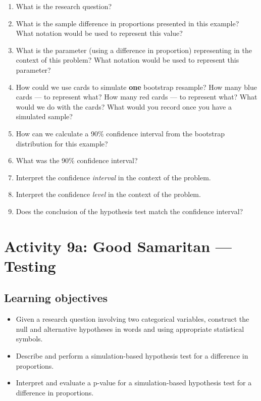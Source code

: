 \documentclass[
]{report}
\newcommand{\rgs}{\vspace{12pt}} %
\begin{document}
\begin{enumerate}
\def\labelenumi{\arabic{enumi}.}
\item
  What is the research question?
  \rgs
\item
  What is the sample difference in proportions presented in this example? What notation would be used to represent this value?
  \rgs
\item
  What is the parameter (using a difference in proportion) representing in the context of this problem? What notation would be used to represent this parameter?
  \rgs
  \rgs
\item
  How could we use cards to simulate \textbf{one} bootstrap resample? How many blue cards --- to represent what? How many red cards --- to represent what? What would we do with the cards? What would you record once you have a simulated sample?
  \rgs
  \rgs
  \rgs
\item
  How can we calculate a 90\% confidence interval from the bootstrap distribution for this example?
  \rgs
\item
  What was the 90\% confidence interval?
  \rgs
\item
  Interpret the confidence \emph{interval} in the context of the problem.
  \rgs
  \rgs
\item
  Interpret the confidence \emph{level} in the context of the problem.
  \rgs
  \rgs
\item
  Does the conclusion of the hypothesis test match the confidence interval?
  \rgs
\end{enumerate}

\newpage

\hypertarget{activity-9a-good-samaritan-testing}{%
\section{Activity 9a: Good Samaritan --- Testing}\label{activity-9a-good-samaritan-testing}}


\hypertarget{learning-objectives-12}{%
\subsection{Learning objectives}\label{learning-objectives-12}}

\begin{itemize}
\item
  Given a research question involving two categorical variables, construct the null and alternative hypotheses
  in words and using appropriate statistical symbols.
\item
  Describe and perform a simulation-based hypothesis test for a difference in proportions.
\item
  Interpret and evaluate a p-value for a simulation-based hypothesis test for a difference in proportions.
\end{itemize}
\end{document}
